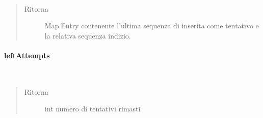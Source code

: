 \documentclass[letterpaper,10pt,italian]{sphinxmanual}
\begin{document}
\begin{fulllineitems}
\label{\detokenize{source/it/unicam/cs/pa/mastermind/gamecore/BoardModel:it.unicam.cs.pa.mastermind.gamecore.BoardModel.lastAttemptAndClue()}}~\begin{quote}\begin{description}
\item[{Ritorna}] \leavevmode
Map.Entry contenente l’ultima sequenza di  inserita come tentativo e la relativa sequenza indizio.

\end{description}\end{quote}

\end{fulllineitems}



\paragraph{leftAttempts}
\label{\detokenize{source/it/unicam/cs/pa/mastermind/gamecore/BoardModel:leftattempts}}

\begin{fulllineitems}
\label{\detokenize{source/it/unicam/cs/pa/mastermind/gamecore/BoardModel:it.unicam.cs.pa.mastermind.gamecore.BoardModel.leftAttempts()}}~\begin{quote}\begin{description}
\item[{Ritorna}] \leavevmode
int numero di tentativi rimasti

\end{description}\end{quote}

\end{fulllineitems}
\end{document}

